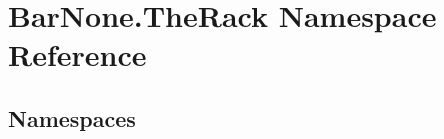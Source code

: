 \hypertarget{namespace_bar_none_1_1_the_rack}{}\section{Bar\+None.\+The\+Rack Namespace Reference}
\label{namespace_bar_none_1_1_the_rack}
\subsection*{Namespaces}
\begin{DoxyCompactItemize}
\end{DoxyCompactItemize}
